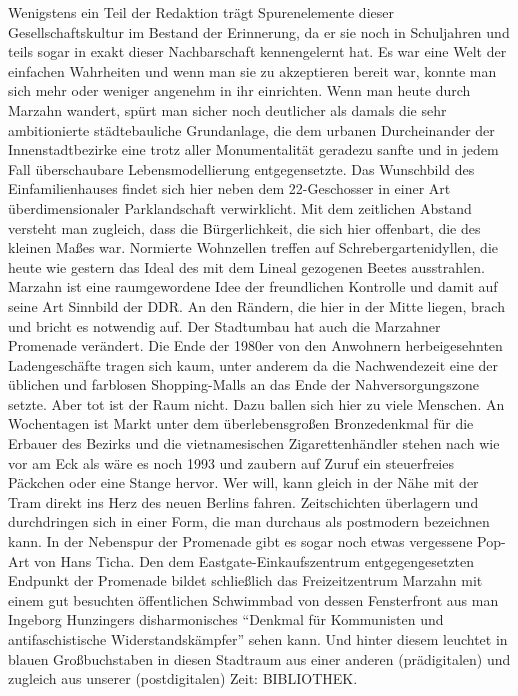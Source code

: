 \documentclass[a4paper,
fontsize=11pt,
oneside,
numbers=noperiodatend,
parskip=half-,
bibliography=totoc,
final
]{scrartcl}
\begin{document}
Wenigstens ein Teil der Redaktion trägt Spurenelemente dieser
Gesellschaftskultur im Bestand der Erinnerung, da er sie noch in
Schuljahren und teils sogar in exakt dieser Nachbarschaft kennengelernt
hat. Es war eine Welt der einfachen Wahrheiten und wenn man sie zu
akzeptieren bereit war, konnte man sich mehr oder weniger angenehm in
ihr einrichten. Wenn man heute durch Marzahn wandert, spürt man sicher
noch deutlicher als damals die sehr ambitionierte städtebauliche
Grundanlage, die dem urbanen Durcheinander der Innenstadtbezirke eine
trotz aller Monumentalität geradezu sanfte und in jedem Fall
überschaubare Lebensmodellierung entgegensetzte. Das Wunschbild des
Einfamilienhauses findet sich hier neben dem 22-Geschosser in einer Art
überdimensionaler Parklandschaft verwirklicht. Mit dem zeitlichen
Abstand versteht man zugleich, dass die Bürgerlichkeit, die sich hier
offenbart, die des kleinen Maßes war. Normierte Wohnzellen treffen auf
Schrebergartenidyllen, die heute wie gestern das Ideal des mit dem
Lineal gezogenen Beetes ausstrahlen. Marzahn ist eine raumgewordene Idee
der freundlichen Kontrolle und damit auf seine Art Sinnbild der DDR. An
den Rändern, die hier in der Mitte liegen, brach und bricht es notwendig
auf. Der Stadtumbau hat auch die Marzahner Promenade verändert. Die Ende
der 1980er von den Anwohnern herbeigesehnten Ladengeschäfte tragen sich
kaum, unter anderem da die Nachwendezeit eine der üblichen und farblosen
Shopping-Malls an das Ende der Nahversorgungszone setzte. Aber tot ist
der Raum nicht. Dazu ballen sich hier zu viele Menschen. An Wochentagen
ist Markt unter dem überlebensgroßen Bronzedenkmal für die Erbauer des
Bezirks und die vietnamesischen Zigarettenhändler stehen nach wie vor am
Eck als wäre es noch 1993 und zaubern auf Zuruf ein steuerfreies
Päckchen oder eine Stange hervor. Wer will, kann gleich in der Nähe mit
der Tram direkt ins Herz des neuen Berlins fahren. Zeitschichten
überlagern und durchdringen sich in einer Form, die man durchaus als
postmodern bezeichnen kann. In der Nebenspur der Promenade gibt es sogar
noch etwas vergessene Pop-Art von Hans Ticha. Den dem
Eastgate-Einkaufszentrum entgegengesetzten Endpunkt der Promenade bildet
schließlich das Freizeitzentrum Marzahn mit einem gut besuchten
öffentlichen Schwimmbad von dessen Fensterfront aus man Ingeborg
Hunzingers disharmonisches \enquote{Denkmal für Kommunisten und
antifaschistische Widerstandskämpfer} sehen kann. Und hinter diesem
leuchtet in blauen Großbuchstaben in diesen Stadtraum aus einer anderen
(prädigitalen) und zugleich aus unserer (postdigitalen) Zeit:
BIBLIOTHEK.
\end{document}
